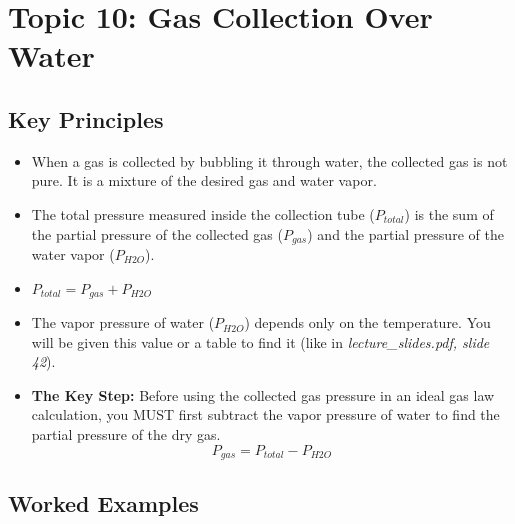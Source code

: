 \documentclass{article}
\begin{document}
\section{Topic 10: Gas Collection Over Water}
\subsection{Key Principles}
\begin{itemize}
    \item When a gas is collected by bubbling it through water, the collected gas is not pure. It is a mixture of the desired gas and water vapor.
    \item The total pressure measured inside the collection tube ($P_{total}$) is the sum of the partial pressure of the collected gas ($P_{gas}$) and the partial pressure of the water vapor ($P_{H2O}$).
    \item $P_{total} = P_{gas} + P_{H2O}$
    \item The vapor pressure of water ($P_{H2O}$) depends only on the temperature. You will be given this value or a table to find it (like in \textit{lecture\_slides.pdf, slide 42}).
    \item \textbf{The Key Step:} Before using the collected gas pressure in an ideal gas law calculation, you MUST first subtract the vapor pressure of water to find the partial pressure of the dry gas.
    \[ P_{gas} = P_{total} - P_{H2O} \]
\end{itemize}

\subsection{Worked Examples}
\end{document}
